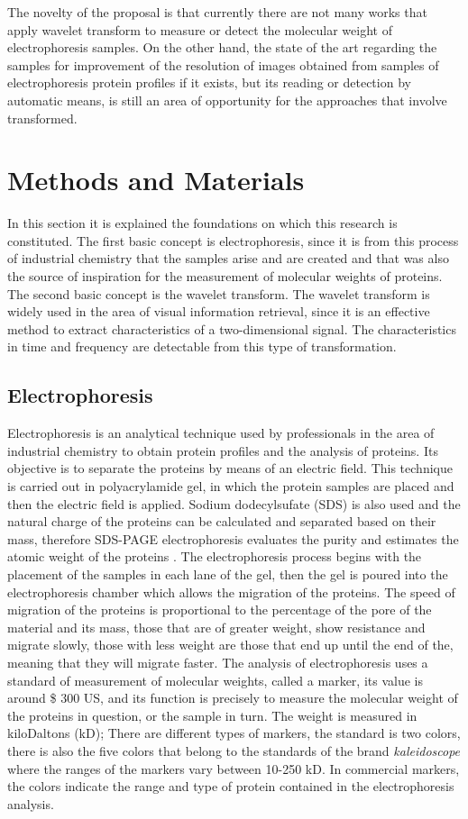 \documentclass[a4paper]{llncs}
\begin{document}
The novelty of the proposal is that currently there are not many works that apply wavelet transform to measure or detect the molecular weight of electrophoresis samples. On the other hand, the state of the art regarding the samples for improvement of the resolution of images obtained from samples of electrophoresis protein profiles if it exists, but its reading or detection by automatic means, is still an area of opportunity for the approaches that involve transformed.



\section{Methods and Materials}
In this section it is explained the foundations on which this research is constituted. The first basic concept is electrophoresis, since it is from this process of industrial chemistry that the samples arise and are created and that was also the source of inspiration for the measurement of molecular weights of proteins. The second basic concept is the wavelet transform. The wavelet transform is widely used in the area of visual information retrieval, since it is an effective method to extract characteristics of a two-dimensional signal. The characteristics in time and frequency are detectable from this type of transformation.

\subsection{Electrophoresis}
Electrophoresis is an analytical technique used by professionals in the area of ​​industrial chemistry to obtain protein profiles and the analysis of proteins. Its objective is to separate the proteins by means of an electric field. This technique is carried out in polyacrylamide gel, in which the protein samples are placed and then the electric field is applied. Sodium dodecylsufate (SDS) is also used and the natural charge of the proteins can be calculated and separated based on their mass, therefore SDS-PAGE electrophoresis evaluates the purity and estimates the atomic weight of the proteins \cite{Horton}.
The electrophoresis process begins with the placement of the samples in each lane of the gel, then the gel is poured into the electrophoresis chamber which allows the migration of the proteins. The speed of migration of the proteins is proportional to the percentage of the pore of the material and its mass, those that are of greater weight, show resistance and migrate slowly, those with less weight are those that end up until the end of the, meaning that they will migrate faster.
The analysis of electrophoresis uses a standard of measurement of molecular weights, called a marker, its value is around \$ 300 US, and its function is precisely to measure the molecular weight of the proteins in question, or the sample in turn. The weight is measured in kiloDaltons (kD); There are different types of markers, the standard is two colors, there is also the five colors that belong to the standards of the brand \textit{kaleidoscope} where the ranges of the markers vary between 10-250 kD. In commercial markers, the colors indicate the range and type of protein contained in the electrophoresis analysis.
\end{document}
